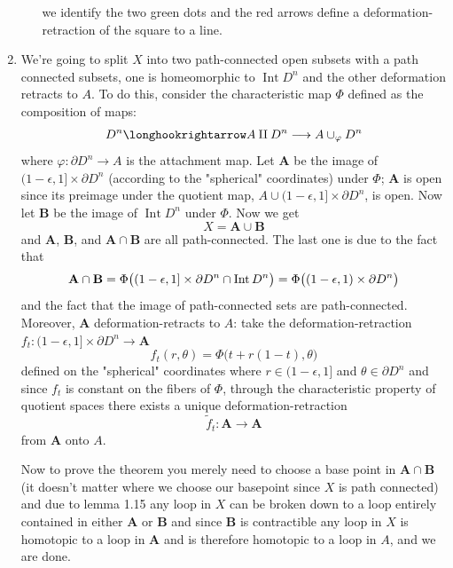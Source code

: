\documentclass{article}
\begin{document}
\begin{homeworkProblem}
\begin{enumerate}[label=1.1.\arabic*]
\begin{enumerate}
            we identify the two green dots and the red arrows define a deformation-retraction of the square to a line.
        \end{enumerate}
        \setcounter{enumi}{17}
        \item We're going to split $X$ into two path-connected open subsets with a path connected subsets, one is homeomorphic to $\operatorname{Int} D^n$ and the other deformation retracts to $A$. To do this, consider the characteristic map $\Phi$ defined as the composition of maps:
        \[D^n \longhookrightarrow A \amalg D^n \longrightarrow A \cup_\varphi D^n\]
        where $\varphi\colon \partial D^n \to A$ is the attachment map. Let $\mathbf{A}$ be the image of $(1-\epsilon, 1] \times \partial D^n$ (according to the "spherical" coordinates) under $\Phi$; $\mathbf{A}$ is open since its preimage under the quotient map, $A \cup (1-\epsilon, 1] \times \partial D^n$, is open. Now let $\mathbf{B}$ be the image of $\operatorname{Int} D^n$ under $\Phi$. Now we get
        \[X = \mathbf{A} \cup \mathbf{B}\]
        and $\mathbf{A}$, $\mathbf{B}$, and $\mathbf{A \cap B}$ are all path-connected. The last one is due to the fact that
        \[\mathbf{A \cap B} = \Phi\big((1-\epsilon, 1] \times \partial D^n \cap \operatorname{Int} D^n \big) = \Phi\big((1-\epsilon, 1) \times \partial D^n \big)\]
        and the fact that the image of path-connected sets are path-connected. Moreover, $\mathbf{A}$ deformation-retracts to $A$: take the deformation-retraction $f_t\colon (1-\epsilon, 1] \times \partial D^n \to \mathbf{A}$ 
        \[f_t(r, \theta) = \Phi\big(t+r(1-t), \theta\big)\]
        defined on the "spherical" coordinates where $r\in (1-\epsilon, 1]$ and $\theta\in\partial D^n$ and since $f_t$ is constant on the fibers of $\Phi$, through the characteristic property of quotient spaces there exists a unique deformation-retraction
        \[\tilde{f}_t\colon \mathbf{A \longrightarrow A}\]
        from $\mathbf{A}$ onto $A$.
        
        Now to prove the theorem you merely need to choose a base point in $\mathbf{A \cap B}$ (it doesn't matter where we choose our basepoint since $X$ is path connected) and due to lemma 1.15 any loop in $X$ can be broken down to a loop entirely contained in either $\mathbf{A}$ or $\mathbf{B}$ and since $\mathbf{B}$ is contractible any loop in $X$ is homotopic to a loop in $\mathbf{A}$ and is therefore homotopic to a loop in $A$, and we are done.


\end{enumerate}
\end{homeworkProblem}
\end{document}
